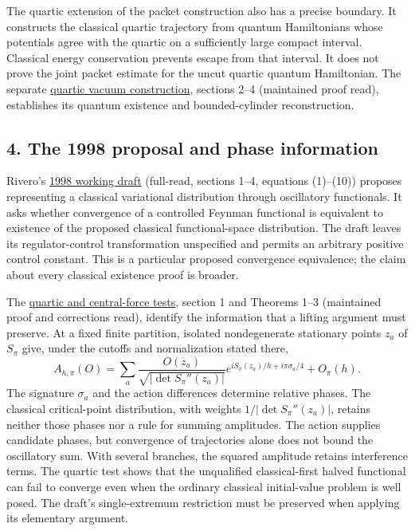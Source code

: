 \documentclass[11pt,a4paper]{article}
\begin{document}
The quartic extension of the packet construction also has a precise
boundary. It constructs the classical quartic trajectory from quantum
Hamiltonians whose potentials agree with the quartic on a sufficiently
large compact interval. Classical energy conservation prevents escape
from that interval. It does not prove the joint packet estimate for the
uncut quartic quantum Hamiltonian. The separate
\href{constructive-qft-one-time.md}{quartic vacuum construction},
sections 2--4 (maintained proof read), establishes its quantum existence
and bounded-cylinder reconstruction.

\hypertarget{the-1998-proposal-and-phase-information}{%
\subsection{4. The 1998 proposal and phase
information}\label{the-1998-proposal-and-phase-information}}

Rivero's \href{https://arxiv.org/html/quant-ph/9803035v1}{1998 working
draft} (full-read, sections 1--4, equations (1)--(10)) proposes
representing a classical variational distribution through oscillatory
functionals. It asks whether convergence of a controlled Feynman
functional is equivalent to existence of the proposed classical
functional-space distribution. The draft leaves its regulator-control
transformation unspecified and permits an arbitrary positive control
constant. This is a particular proposed convergence equivalence; the
claim about every classical existence proof is broader.

The \href{rivero-1998-conjecture-central-forces.md}{quartic and
central-force tests}, section 1 and Theorems 1--3 (maintained proof and
corrections read), identify the information that a lifting argument must
preserve. At a fixed finite partition, isolated nondegenerate stationary
points \(z_a\) of \(S_\pi\) give, under the cutoffs and normalization
stated there, \[
 A_{h,\pi}(O)=\sum_a
 \frac{O(z_a)}{\sqrt{|\det S_\pi''(z_a)|}}
 e^{iS_\pi(z_a)/h+i\pi\sigma_a/4}+O_\pi(h). \tag{5}
\] The signature \(\sigma_a\) and the action differences determine
relative phases. The classical critical-point distribution, with weights
\(1/|\det S_\pi''(z_a)|\), retains neither those phases nor a rule for
summing amplitudes. The action supplies candidate phases, but
convergence of trajectories alone does not bound the oscillatory sum.
With several branches, the squared amplitude retains interference terms.
The quartic test shows that the unqualified classical-first halved
functional can fail to converge even when the ordinary classical
initial-value problem is well posed. The draft's single-extremum
restriction must be preserved when applying its elementary argument.
\end{document}
